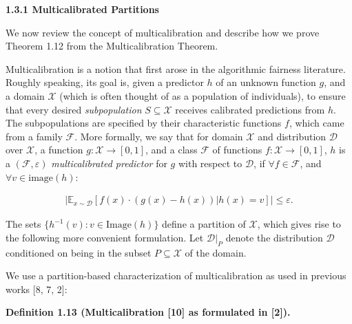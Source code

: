 \documentclass[10pt,a4paper]{article}
\begin{document}
\par\medskip\noindent\textbf{
1.3.1 Multicalibrated Partitions}\par




We now review the concept of multicalibration and describe how we prove Theorem 1.12 from the Multicalibration Theorem.\par




Multicalibration is a notion that first arose in the algorithmic fairness literature. Roughly speaking, its goal is, given a predictor $h$ of an unknown function $g$, and a domain $\mathcal{X}$ (which is often thought of as a population of individuals), to ensure that every desired \emph{subpopulation} $S\subseteq\mathcal{X}$ receives calibrated predictions from $h$. The subpopulations are specified by their characteristic functions $f$, which came from a family $\mathcal{F}$. More formally, we say that for domain $\mathcal{X}$ and distribution $\mathcal{D}$ over $\mathcal{X}$, a function $g:\mathcal{X}\rightarrow[0,1]$, and a class $\mathcal{F}$ of functions $f:\mathcal{X}\rightarrow[0,1]$, $h$ is a $(\mathcal{F},\varepsilon)$\emph{ multicalibrated predictor} for $g$ with respect to $\mathcal{D}$, if $\forall f\in\mathcal{F}$, and $\forall v\in\mathrm{image}(h)$:\par


\[\begin{gathered}
\left|\mathbb{E}_{x\sim\mathcal{D}}[f(x)\cdot(g(x)-h(x))|h(x)=v]\right|\leq\varepsilon.
\end{gathered}\]




The sets $\{h^{-1}(v):v\in\mathrm{Image}(h)\}$ define a partition of $\mathcal{X}$, which gives rise to the following more convenient formulation. Let $\mathcal{D}|_{P}$ denote the distribution $\mathcal{D}$ conditioned on being in the subset $P\subseteq\mathcal{X}$ of the domain.\par




We use a partition-based characterization of multicalibration as used in previous works [8, 7, 2]:\par





\par\medskip\noindent\textbf{
\textbf{Definition 1.13}\textbf{ }(Multicalibration [10] as formulated in [2])\textbf{.}
}\par
\end{document}
